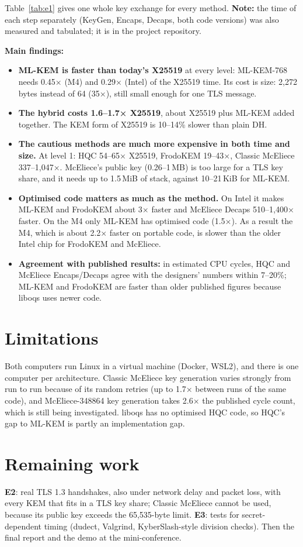 \documentclass[11pt,a4paper]{article}
\begin{document}
Table~\ref{tab:e1} gives one whole key exchange for every method. \textbf{Note:} the time of each step
separately (KeyGen, Encaps, Decaps, both code versions) was also measured and tabulated; it is in the project repository.

\textbf{Main findings:}
\begin{itemize}
  \item \textbf{ML-KEM is faster than today's X25519} at every level: ML-KEM-768 needs 0.45× (M4) and 0.29×
  (Intel) of the X25519 time. Its cost is size: 2,272 bytes instead of 64 (35×), still small enough for one
  TLS message.
  \item \textbf{The hybrid costs 1.6--1.7× X25519}, about X25519 plus ML-KEM added together.
  The KEM form of X25519 is 10--14\% slower than plain DH.
  \item \textbf{The cautious methods are much more expensive in both time and size.} At level 1: HQC 54--65×
  X25519, FrodoKEM 19--43×, Classic McEliece 337--1,047×. McEliece's public key (0.26--1\,MB) is too large for
  a TLS key share, and it needs up to 1.5\,MiB of stack, against 10--21\,KiB for ML-KEM.
  \item \textbf{Optimised code matters as much as the method.} On Intel it makes ML-KEM and FrodoKEM about
  3× faster and McEliece Decaps 510--1,400× faster. On the M4 only ML-KEM has optimised code (1.5×). As a
  result the M4, which is about 2.2× faster on portable code, is slower than the older Intel chip for FrodoKEM
  and McEliece.
  \item \textbf{Agreement with published results:} in estimated CPU cycles, HQC and McEliece Encaps/Decaps agree
  with the designers' numbers within 7--20\%; ML-KEM and FrodoKEM are faster than older published figures
  because liboqs uses newer code.
\end{itemize}

\section{Limitations}
Both computers run Linux in a virtual machine (Docker, WSL2), and there is one computer per architecture.
Classic McEliece key generation varies strongly from run to run because of its random retries (up to 1.7×
between runs of the same code), and
McEliece-348864 key generation takes 2.6× the published cycle count, which is still being investigated.
liboqs has no optimised HQC code, so HQC's gap to ML-KEM is partly an implementation gap.

\section{Remaining work}
\textbf{E2}: real TLS 1.3 handshakes, also under network delay and packet loss, with every KEM that fits in a
TLS key share; Classic McEliece cannot be used, because its public key exceeds the 65,535-byte limit.
\textbf{E3}: tests for secret-dependent timing (dudect, Valgrind, KyberSlash-style division checks).
Then the final report and the demo at the mini-conference.
\end{document}
